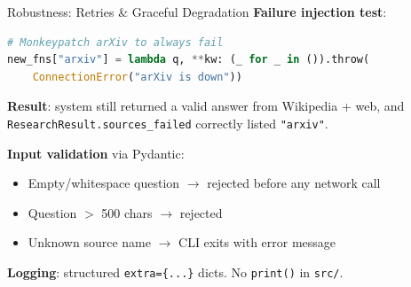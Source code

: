 \documentclass[aspectratio=169]{beamer}
\begin{document}
\begin{frame}[fragile]{Robustness: Retries \& Graceful Degradation}
\textbf{Failure injection test}:

\begin{lstlisting}[language=Python]
# Monkeypatch arXiv to always fail
new_fns["arxiv"] = lambda q, **kw: (_ for _ in ()).throw(
    ConnectionError("arXiv is down"))
\end{lstlisting}

\textbf{Result}: system still returned a valid answer from Wikipedia + web, and
\texttt{ResearchResult.sources\_failed} correctly listed \texttt{"arxiv"}.

\vspace{1em}
\textbf{Input validation} via Pydantic:
\begin{itemize}
  \item Empty/whitespace question $\to$ rejected before any network call
  \item Question $>$ 500 chars $\to$ rejected
  \item Unknown source name $\to$ CLI exits with error message
\end{itemize}

\textbf{Logging}: structured \texttt{extra=\{...\}} dicts. No \texttt{print()} in \texttt{src/}.
\end{frame}
\end{document}

